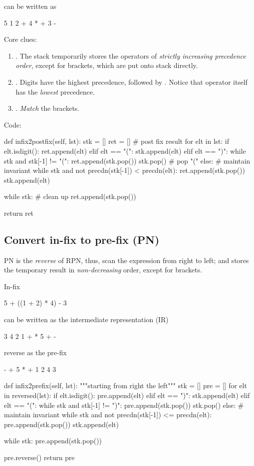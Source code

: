 can be written as
\begin{python}
5 1 2 + 4 * + 3 - 
\end{python}
Core clues:
\begin{enumerate}
\item {}. The stack temporarily stores the operators of \textit{strictly increasing precedence order}, except for brackets, which are put onto stack directly.
\item {}. Digits have the highest precedence, followed by \pyinline{*, /, +, (}. Notice that \pyinline{(} operator itself has the \textit{lowest} precedence.
\item {}. \textit{Match} the brackets. 
\end{enumerate}
Code:
\begin{python}
def infix2postfix(self, lst):
  stk = []
  ret = []  # post fix result
  for elt in lst:
    if elt.isdigit():
      ret.append(elt)
    elif elt == "(":
      stk.append(elt)
    elif elt == ")":
      while stk and stk[-1] != "(":
        ret.append(stk.pop())
      stk.pop()  # pop "("
    else:
      # maintain invariant
      while stk and not precdn(stk[-1]) < precdn(elt):
        ret.append(stk.pop())
      stk.append(elt)

  while stk:  # clean up 
    ret.append(stk.pop())

  return ret
\end{python}

\subsection{Convert in-fix to pre-fix (PN)}
PN is the \textit{reverse} of RPN, thus, scan the expression from right to left; and  stores the temporary result in \textit{non-decreasing} order, except for brackets.


In-fix
\begin{python}
5 + ((1 + 2) * 4) - 3
\end{python}

can be written as the intermediate representation (IR)
\begin{python}
3 4 2 1 + * 5 + -
\end{python}

reverse as the pre-fix
\begin{python}
- + 5 * + 1 2 4 3
\end{python}

\begin{python}
  def infix2prefix(self, lst):
    """starting from right the left"""
    stk = []
    pre = []
    for elt in reversed(lst):
      if elt.isdigit():
        pre.append(elt)
      elif elt == ")":
        stk.append(elt)
      elif elt == "(":
        while stk and stk[-1] != ")":
          pre.append(stk.pop())
        stk.pop()
      else:
        # maintain invariant
        while stk and not precdn(stk[-1]) <= precdn(elt):  
          pre.append(stk.pop())
        stk.append(elt)

    while stk:
      pre.append(stk.pop())

    pre.reverse()
    return pre
\end{python}


